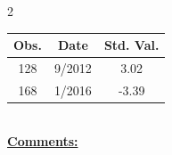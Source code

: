 
\bigskip 
\begin{multicols}{2}{ 
\begin{tabular}{ccc}
\hline  Obs.  &  Date &  Std. Val. \\ 
\hline 
                      128 &        9/2012 &          3.02 \vspace{-.12in} \\  
                      168 &        1/2016 &         -3.39 \vspace{-.12in} \\  
 \end{tabular} 
\\ 
 \columnbreak 
 \singlespacing 
 \underline{\textbf{Comments:}} \\ 
 \bigskip       

 } 
\end{multicols} 

